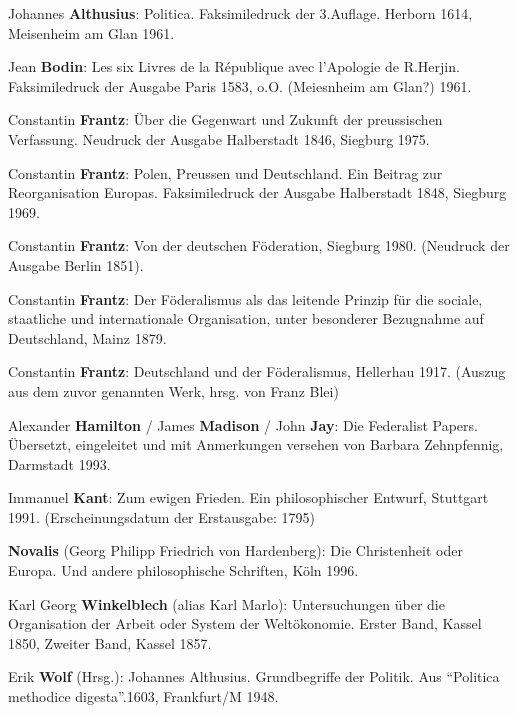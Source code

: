 \documentclass[a4paper,12pt]{article}
\begin{document}
\begin{thebibliography}{99}

 Johannes {\bf Althusius}:
Politica. Faksimiledruck der 3.Auflage. Herborn 1614, Meisenheim am
Glan 1961.

 Jean {\bf Bodin}: Les six Livres de la République
avec l'Apologie de R.Herjin. Faksimiledruck der Ausgabe Paris 1583,
o.O. (Meiesnheim am Glan?) 1961.

 Constantin {\bf Frantz}: Über die
Gegenwart und Zukunft der preussischen Verfassung. Neudruck der
Ausgabe Halberstadt 1846, Siegburg 1975.

 Constantin {\bf Frantz}: Polen, Preussen und
Deutschland. Ein Beitrag zur Reorganisation Europas. Faksimiledruck
der Ausgabe Halberstadt 1848, Siegburg 1969.

 Constantin {\bf Frantz}: Von der
deutschen Föderation, Siegburg 1980. (Neudruck der Ausgabe Berlin
1851).

 Constantin {\bf Frantz}: Der
Föderalismus als das leitende Prinzip für die sociale, staatliche
und internationale Organisation, unter besonderer Bezugnahme auf
Deutschland, Mainz 1879.

 Constantin {\bf Frantz}: Deutschland
und der Föderalismus, Hellerhau 1917. (Auszug aus dem zuvor
genannten Werk, hrsg. von Franz Blei)

 Alexander {\bf Hamilton} / James {\bf Madison} /
John {\bf Jay}: Die Federalist Papers. Übersetzt, eingeleitet und
mit Anmerkungen versehen von Barbara Zehnpfennig, Darmstadt 1993.

 Immanuel {\bf Kant}: Zum ewigen Frieden. Ein
philosophischer Entwurf, Stuttgart 1991. (Erscheinungsdatum der
Erstausgabe: 1795)

 {\bf Novalis} (Georg Philipp Friedrich von
Hardenberg): Die Christenheit oder Europa. Und andere
philosophische Schriften, Köln 1996.

 Karl Georg {\bf Winkelblech} (alias Karl
Marlo): Untersuchungen über die Organisation der Arbeit oder System
der Weltökonomie. Erster Band, Kassel 1850, Zweiter Band, Kassel
1857.

 Erik {\bf Wolf} (Hrsg.): Johannes
Althusius. Grundbegriffe der Politik. Aus "`Politica methodice
digesta"'.1603, Frankfurt/M 1948.




\end{thebibliography}
\end{document}
